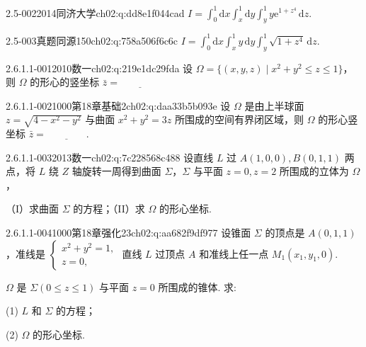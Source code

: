 \begin{q}{2.5-002}{2014同济大学}{ch02:q:dd8e1f044cad}
$\displaystyle I=\int_0^1 \mathrm{d}x\int_x^1 \mathrm{d}y\int_y^1 y\mathrm{e}^{1+z^4}\,\mathrm{d}z.$
\end{q}

\begin{q}{2.5-003}{真题同源150}{ch02:q:758a506f6c6c}
$\displaystyle I=\int_0^1\mathrm{d}x\int_x^1 y\,\mathrm{d}y\int_y^1\sqrt{1+z^4}\,\mathrm{d}z.$
\end{q}

\par\addvspace{2.4ex}\noindent
\begin{minipage}{\linewidth}



\begin{q}{2.6.1.1-001}{2010数一}{ch02:q:219e1dc29fda}
设 $\Omega=\{(x,y,z)\mid x^2+y^2\leqslant z\leqslant 1\}$，则 $\Omega$ 的形心的竖坐标 $\bar z=\underline{\hspace{4em}}$
\end{q}
\end{minipage}


\begin{q}{2.6.1.1-002}{1000第18章基础2}{ch02:q:daa33b5b093e}
设 $\Omega$ 是由上半球面 $z=\sqrt{4-x^2-y^2}$ 与曲面 $x^2+y^2=3z$ 所围成的空间有界闭区域，则 $\Omega$ 的形心竖坐标 $\bar{z}= \underline{\hspace{4em}}$.
\end{q}

\begin{q}{2.6.1.1-003}{2013数一}{ch02:q:7c228568c488}
设直线 $L$ 过 $A(1,0,0),B(0,1,1)$ 两点，将 $L$ 绕 $Z$ 轴旋转一周得到曲面 $\Sigma$，$\Sigma$ 与平面 $z=0,z=2$ 所围成的立体为 $\Omega$，

（I）求曲面 $\Sigma$ 的方程；（II）求 $\Omega$ 的形心坐标.
\end{q}

\begin{q}{2.6.1.1-004}{1000第18章强化23}{ch02:q:aa682f9df977}
设锥面 $\Sigma$ 的顶点是 $A(0,1,1)$，准线是 $\begin{cases} x^2+y^2=1,\\ z=0, \end{cases}$ 直线 $L$ 过顶点 $A$ 和准线上任一点 $M_1(x_1,y_1,0)$.

$\Omega$ 是 $\Sigma(0\le z\le1)$ 与平面 $z=0$ 所围成的锥体. 求:

(1) $L$ 和 $\Sigma$ 的方程；

(2) $\Omega$ 的形心坐标.
\end{q}


